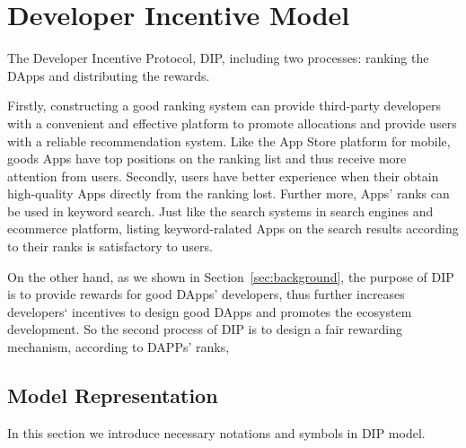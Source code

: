 \section{Developer Incentive Model}
The Developer Incentive Protocol, DIP, including two processes: ranking the DApps and distributing the rewards. 

Firstly, constructing a good ranking system can provide third-party developers with a convenient and effective  platform to promote allocations and provide users with a reliable recommendation system. Like the App Store platform for mobile, goods Apps have top positions on the ranking list and thus receive more attention from users. Secondly, users have better experience when their obtain high-quality Apps directly from the ranking lost. Further more, Apps' ranks can be used in keyword search. Just like the search systems in search engines and ecommerce platform,  listing keyword-ralated Apps on the search results according to their ranks is satisfactory to users. 

On the other hand, as we shown in Section~\ref{sec:background}, the purpose of DIP is to provide rewards for good DApps' developers, thus further increases developers‘ incentives to design good DApps and promotes the ecosystem development. So the second process of DIP is to design a fair rewarding mechanism, according to DAPPs' ranks, 

\subsection{Model Representation}
\label{subsection:parameters}
In this section we introduce necessary notations and symbols in DIP model.

